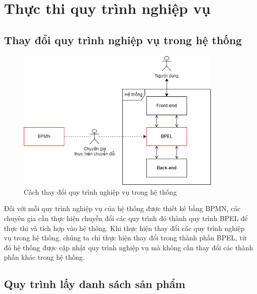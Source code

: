 \section{Thực thi quy trình nghiệp vụ}

\subsection{Thay đổi quy trình nghiệp vụ trong hệ thống}
\begin{figure}[!htp]
    \centering
    \includegraphics[width=10cm]{img/bpel/tranfer.png}
    \newline
    \caption{Cách thay đổi quy trình nghiệp vụ trong hệ thống}
\end{figure}

Đối với mỗi quy trình nghiệp vụ của hệ thống được thiết kế bằng BPMN, các chuyên gia cần thực hiện chuyền đổi các quy trình đó thành quy trình BPEL để thực thi và tích hợp vào hệ thông. Khi thực hiện thay đổi các quy trình nghiệp vụ trong hệ thống, chúng ta chỉ thực hiện thay đổi trong thành phần BPEL, từ đó hệ thống được cập nhật quy trình nghiệp vụ mà không cần thay đổi các thành phần khác trong hệ thống.


\subsection{Quy trình lấy danh sách sản phẩm}

